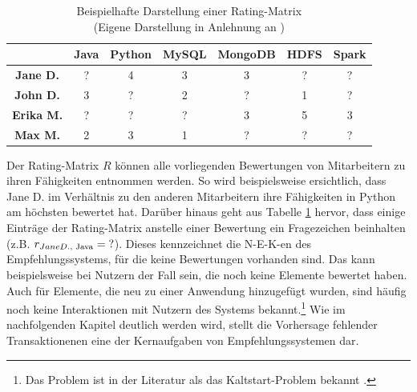 \begin{table}[htbp]
    \begin{center}
    \begin{tabular}{|c||c|c|c|c|c|c|}
    \hline
    {} & {\textbf{Java}} & {\textbf{Python}} & {\textbf{MySQL}} & {\textbf{MongoDB}} & {\textbf{HDFS}} & {\textbf{Spark}}\\
    \hline
    \hline
    \textbf{Jane D.} & ? & 4 & 3 & 3 & ? & ?\\
    \hline
    \textbf{John D.} & 3 & ? & 2 & ? & 1 & ?\\
    \hline
    \textbf{Erika M.} & ? & ? & ? & 3 & 5 & 3\\
    \hline
    \textbf{Max M.} & 2 & 3 & 1 & ? & ? & ?\\
    \hline
    \end{tabular}
    \end{center}
    \caption[Beispielhafte Darstellung einer Rating-Matrix ]{Beispielhafte Darstellung einer Rating-Matrix \\
	(Eigene Darstellung in Anlehnung an \cite[S. 16]{link:booklet})}
	\label{tab1}
\end{table}

Der Rating-Matrix $R$ können alle vorliegenden Bewertungen von Mitarbeitern zu ihren Fähigkeiten entnommen werden.
So wird beispielsweise ersichtlich, dass Jane D. im Verhältnis zu den anderen Mitarbeitern ihre Fähigkeiten in Python am höchsten bewertet hat.
Darüber hinaus geht aus Tabelle \ref{tab1} hervor, dass einige Einträge der Rating-Matrix anstelle einer Bewertung ein Fragezeichen beinhalten (z.B. $r_{Jane D.\textnormal{, Java}}=\textnormal{?}$).
Dieses kennzeichnet die \ac{N-E-K}-en des Empfehlungssystems, für die keine Bewertungen vorhanden sind.
Das kann beispielsweise bei Nutzern der Fall sein, die noch keine Elemente bewertet haben.
Auch für Elemente, die neu zu einer Anwendung hinzugefügt wurden, sind häufig noch keine Interaktionen mit Nutzern des Systems bekannt.\footnote{Das Problem ist in der Literatur als das Kaltstart-Problem bekannt \cite[S. 407]{unternährer:article}.}
Wie im nachfolgenden Kapitel deutlich werden wird, stellt die Vorhersage fehlender Transaktionenen eine der Kernaufgaben von Empfehlungssystemen dar.

